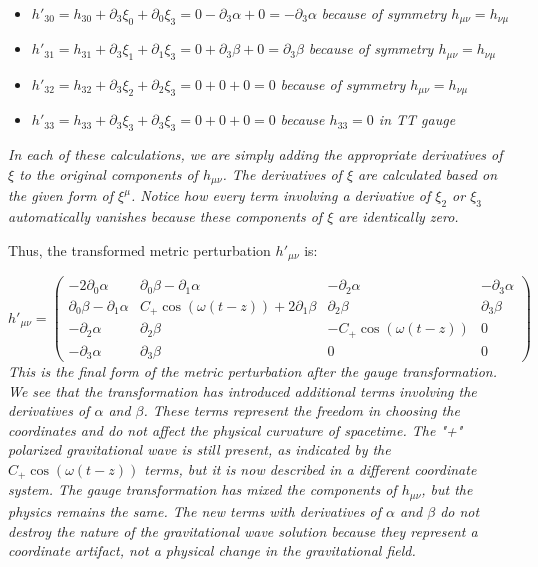 \documentclass{article}
\begin{document}
\begin{itemize}
    \item $h'_{30} = h_{30} + \partial_3 \xi_0 + \partial_0 \xi_3 = 0 -\partial_3 \alpha + 0= -\partial_3 \alpha$ \emph{because of symmetry $h_{\mu\nu}=h_{\nu\mu}$}
    \item $h'_{31} = h_{31} + \partial_3 \xi_1 + \partial_1 \xi_3 = 0 + \partial_3 \beta + 0 = \partial_3 \beta$ \emph{because of symmetry $h_{\mu\nu}=h_{\nu\mu}$}
    \item $h'_{32} = h_{32} + \partial_3 \xi_2 + \partial_2 \xi_3 = 0 + 0 + 0 = 0$ \emph{because of symmetry $h_{\mu\nu}=h_{\nu\mu}$}
    \item $h'_{33} = h_{33} + \partial_3 \xi_3 + \partial_3 \xi_3 = 0 + 0 + 0 = 0$ \emph{because $h_{33}=0$ in TT gauge}
\end{itemize}
\emph{In each of these calculations, we are simply adding the appropriate derivatives of $\xi$ to the original components of $h_{\mu\nu}$. The derivatives of $\xi$ are calculated based on the given form of $\xi^{\mu}$. Notice how every term involving a derivative of $\xi_2$ or $\xi_3$ automatically vanishes because these components of $\xi$ are identically zero.}

Thus, the transformed metric perturbation $h'_{\mu \nu}$ is:

\begin{equation}
h'_{\mu \nu} = \begin{pmatrix}
-2\partial_0 \alpha & \partial_0 \beta - \partial_1 \alpha & -\partial_2 \alpha & -\partial_3 \alpha \\
\partial_0 \beta - \partial_1 \alpha & C_{+} \cos(\omega(t-z)) + 2\partial_1 \beta & \partial_2 \beta & \partial_3 \beta \\
-\partial_2 \alpha & \partial_2 \beta & -C_{+} \cos(\omega(t-z)) & 0 \\
-\partial_3 \alpha & \partial_3 \beta & 0 & 0
\end{pmatrix}
\end{equation}
\emph{This is the final form of the metric perturbation after the gauge transformation. We see that the transformation has introduced additional terms involving the derivatives of $\alpha$ and $\beta$. These terms represent the freedom in choosing the coordinates and do not affect the physical curvature of spacetime. The "+" polarized gravitational wave is still present, as indicated by the $C_{+} \cos(\omega(t-z))$ terms, but it is now described in a different coordinate system. The gauge transformation has mixed the components of $h_{\mu\nu}$, but the physics remains the same. The new terms with derivatives of $\alpha$ and $\beta$ do not destroy the nature of the gravitational wave solution because they represent a coordinate artifact, not a physical change in the gravitational field.}
\end{document}
